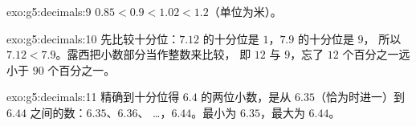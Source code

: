 \begin{solution}{exo:g5:decimals:9}
$0.85 < 0.9 < 1.02 < 1.2$（单位为米）。
\end{solution}

\begin{solution}{exo:g5:decimals:10}
先比较十分位：$7.12$ 的十分位是 $1$，$7.9$ 的十分位是 $9$，
所以 $7.12 < 7.9$。露西把小数部分当作整数来比较，
即 $12$ 与 $9$，忘了 $12$ 个百分之一远小于
$90$ 个百分之一。
\end{solution}

\begin{solution}{exo:g5:decimals:11}
精确到十分位得 $6.4$ 的两位小数，是从
$6.35$（恰为时进一）到 $6.44$ 之间的数：$6.35$、$6.36$、
\dots，$6.44$。最小为 $6.35$，最大为 $6.44$。
\end{solution}
